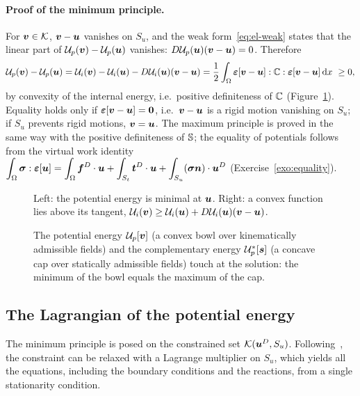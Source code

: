 \paragraph{Proof of the minimum principle.} For $\bm{v}\in\mathcal{K}$, $\bm{v}-\bm{u}$
vanishes on $S_u$, and the weak form~\eqref{eq:el-weak} states that the
linear part of $\mathcal U_p(\bm{v})-\mathcal U_p(\bm{u})$ vanishes:
$D\mathcal U_p(\bm{u})(\bm{v}-\bm{u})=0$. Therefore
\[
  \mathcal U_p(\vv)-\mathcal U_p(\vu)
  =\mathcal U_i(\vv)-\mathcal U_i(\vu)-D\mathcal U_i(\vu)(\vv-\vu)
  =\frac12\int_\Omega\eps[\vv-\vu]:\bbC:\eps[\vv-\vu]\dd x\ \ge0,
\]
by convexity of the internal energy, i.e.\ positive definiteness of $\mathbb{C}$
(Figure~\ref{fig:convexity}). Equality holds only if $\bm{\varepsilon}[\bm{v}-\bm{u}]=\bm{0}$,
i.e.\ $\bm{v}-\bm{u}$ is a rigid motion vanishing on $S_u$; if $S_u$ prevents rigid
motions, $\bm{v}=\bm{u}$. The maximum principle is proved in the same way with the
positive definiteness of $\mathbb{S}$; the equality of potentials follows from the
virtual work identity
$\displaystyle \int_\Omega\bm{\sigma}:\bm{\varepsilon}[\bm{u}]=\int_\Omega\bm{f}^{D}\cdot\bm{u}+\int_{S_t}\bm{t}^{D}\cdot\bm{u}+\int_{S_u}(\bm{\sigma}\bm{n})\cdot\bm{u}^{D}$
(Exercise~\ref{exo:equality}).

\begin{figure}[h]
\centering

\caption{Left: the potential energy is minimal at $\bm{u}$. Right: a convex
function lies above its tangent, $\mathcal U_i(\bm{v})\ge\mathcal U_i(\bm{u})+D\mathcal U_i(\bm{u})(\bm{v}-\bm{u})$.}
\label{fig:convexity}
\end{figure}

\begin{figure}[h]
\centering

\caption{The potential energy $\mathcal U_p[\bm{v}]$ (a convex bowl over
kinematically admissible fields) and the complementary energy
$\mathcal U_p^\ast[\bm{s}]$ (a concave cap over statically admissible
fields) touch at the solution: the minimum of the bowl equals the maximum
of the cap.}
\label{fig:energy-scheme}
\end{figure}

\subsection{The Lagrangian of the potential energy}\label{ssec:el-lagrangian}
%
The minimum principle is posed on the constrained set $\mathcal{K}(\bm{u}^{D},S_u)$.
Following~\cite{BonnetFrangi2007}, the constraint can be relaxed with a
Lagrange multiplier on $S_u$, which yields all the equations, including the
boundary conditions and the reactions, from a single stationarity condition.

